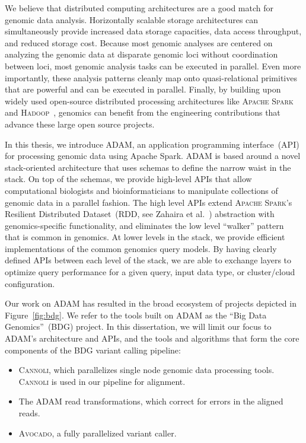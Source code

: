 \documentclass[phd]{ucbthesis}
\begin{document}
We believe that distributed computing architectures are a good match for
genomic data analysis. Horizontally scalable storage architectures can
simultaneously provide increased data storage capacities, data access
throughput, and reduced storage cost. Because most genomic analyses are centered
on analyzing the genomic data at disparate genomic loci without coordination
between loci, most genomic analysis tasks can be executed in parallel. Even more
importantly, these analysis patterns cleanly map onto quasi-relational primitives
that are powerful and can be executed in parallel. Finally, by building upon
widely used open-source distributed processing architectures like \textsc{Apache
Spark}~\cite{zaharia12} and \textsc{Hadoop}~\cite{hadoop}, genomics can benefit
from the engineering contributions that advance these large open source projects.

In this thesis, we introduce \textsc{ADAM}, an application programming
interface~(API) for processing genomic data using Apache Spark. \textsc{ADAM}
is based around a novel stack-oriented architecture that uses schemas to define
the narrow waist in the stack. On top of the schemas, we provide high-level
APIs that allow computational biologists and bioinformaticians to manipulate
collections of genomic data in a parallel fashion. The high level APIs extend
\textsc{Apache Spark}'s Resilient Distributed Dataset~(RDD, see Zahaira et
al.~\cite{zaharia12}) abstraction with genomics-specific functionality, and
eliminates the low level ``walker'' pattern~\cite{mckenna10} that is common in
genomics. At lower levels in the stack, we provide efficient implementations
of the common genomics query models. By having clearly defined APIs between
each level of the stack, we are able to exchange layers to optimize query
performance for a given query, input data type, or cluster/cloud configuration.

Our work on \textsc{ADAM} has resulted in the broad ecosystem of projects
depicted in Figure~\ref{fig:bdg}. We refer to the tools built on \textsc{ADAM}
as the ``Big Data Genomics''~(BDG) project. In this dissertation, we will limit
our focus to \textsc{ADAM}'s architecture and APIs, and the tools and algorithms
that form the core components of the BDG variant calling pipeline:

\begin{itemize}
\item \textsc{Cannoli}, which parallelizes single node genomic data processing
  tools. \textsc{Cannoli} is used in our pipeline for alignment.
\item The \textsc{ADAM} read transformations, which correct for errors in the
  aligned reads.
\item \textsc{Avocado}, a fully parallelized variant caller.
\end{itemize}
\end{document}
